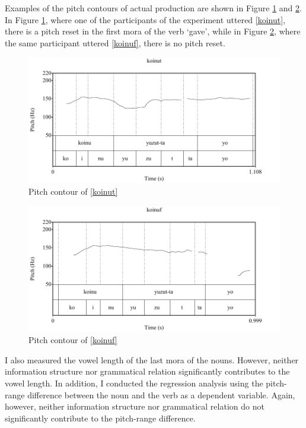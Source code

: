 Examples of the pitch contours of actual production are shown
in Figure \ref{Int:Fig:koinut} and \ref{Int:Fig:koinuf}.
In Figure \ref{Int:Fig:koinut},
where one of the participants of the experiment uttered \ref{koinut},
there is a pitch reset in the first mora of the verb  `gave',
while in Figure \ref{Int:Fig:koinuf},
where the same participant uttered \ref{koinuf},
there is no pitch reset.

\begin{figure}
	\begin{center}
		\includegraphics[width=.6\textwidth]{figure/pitcht.pdf}
	\end{center}
	\caption{Pitch contour of \ref{koinut}}
	\label{Int:Fig:koinut}
\end{figure}
\begin{figure}
	\begin{center}
		\includegraphics[width=.6\textwidth]{figure/pitchf.pdf}
	\end{center}
	\caption{Pitch contour of \ref{koinuf}}
	\label{Int:Fig:koinuf}
\end{figure}

I also measured the vowel length of the last mora of the nouns.
However, neither information structure nor grammatical relation significantly contributes to the vowel length.
In addition, I conducted the regression analysis
using the pitch-range difference between the noun and the verb as a dependent variable.
Again, however,
neither information structure nor grammatical relation do not significantly contribute to the pitch-range difference.


